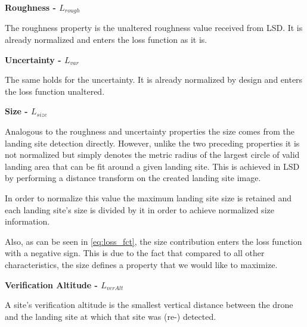 \textbf{Roughness - $L_{rough}$}

The roughness property is the unaltered roughness value received from LSD. It is already normalized and enters the loss function as it is. 

\textbf{Uncertainty - $L_{var}$}

The same holds for the uncertainty. It is already normalized by design and enters the loss function unaltered.

\textbf{Size - $L_{size}$}

Analogous to the roughness and uncertainty properties the size comes from the landing site detection directly. However, unlike the two preceding properties it is not normalized but simply denotes the metric radius of the largest circle of valid landing area that can be fit around a given landing site. This is achieved in LSD by performing a distance transform on the created landing site image.

In order to normalize this value the maximum landing site size is retained and each landing site's size is divided by it in order to achieve normalized size information.

Also, as can be seen in \cref{eq:loss_fct}, the size contribution enters the loss function with a negative sign. This is due to the fact that compared to all other characteristics, the size defines a property that we would like to maximize.

\textbf{Verification Altitude - $L_{verAlt}$}\label{subsubsec:ver_alt}

A site's verification altitude is the smallest vertical distance between the drone and the landing site at which that site was (re-) detected. 


